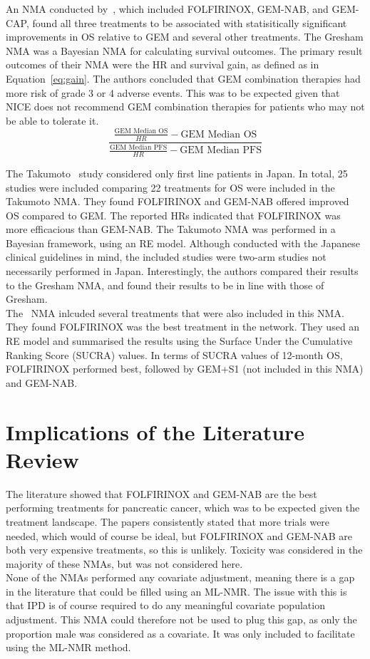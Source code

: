 An NMA conducted by~\cite{gresham2014}, which included FOLFIRINOX, GEM-NAB, and GEM-CAP, found all three treatments to be associated with statisitically significant improvements in OS relative to GEM and several other treatments. The Gresham NMA was a Bayesian NMA for calculating survival outcomes. The primary result outcomes of their NMA were the HR and survival gain, as defined as in Equation~\ref{eq:gain}. The authors concluded that GEM combination therapies had more risk of grade 3 or 4 adverse events. This was to be expected given that NICE does not recommend GEM combination therapies for patients who may not be able to tolerate it. \\

\begin{equation}
    \frac{\frac{\text{GEM Median OS}}{HR}-\text{GEM Median OS}}{\frac{\text{GEM Median PFS}}{HR}-\text{GEM Median PFS}}
    \label{eq:gain}
\end{equation}

The Takumoto~\cite{takumoto} study considered only first line patients in Japan. In total, 25 studies were included comparing 22 treatments for OS were included in the Takumoto NMA. They found FOLFIRINOX and GEM-NAB offered improved OS compared to GEM. The reported HRs indicated that FOLFIRINOX was more efficacious than GEM-NAB. The Takumoto NMA was performed in a Bayesian framework, using an RE model. Although conducted with the Japanese clinical guidelines in mind, the included studies were two-arm studies not necessarily performed in Japan. Interestingly, the authors compared their results to the Gresham NMA, and found their results to be in line with those of Gresham. \\

The~\cite{zhang} NMA inlcuded several treatments that were also included in this NMA. They found FOLFIRINOX was the best treatment in the network. They used an RE model and summarised the results using the Surface Under the Cumulative Ranking Score (SUCRA) values. In terms of SUCRA values of 12-month OS, FOLFIRINOX performed best, followed by GEM+S1 (not included in this NMA) and GEM-NAB. 

\section{Implications of the Literature Review}
The literature showed that FOLFIRINOX and GEM-NAB are the best performing treatments for pancreatic cancer, which was to be expected given the treatment landscape. The papers consistently stated that more trials were needed, which would of course be ideal, but FOLFIRINOX and GEM-NAB are both very expensive treatments, so this is unlikely. Toxicity was considered in the majority of these NMAs, but was not considered here. \\

None of the NMAs performed any covariate adjustment, meaning there is a gap in the literature that could be filled using an ML-NMR. The issue with this is that IPD is of course required to do any meaningful covariate population adjustment. This NMA could therefore not be used to plug this gap, as only the proportion male was considered as a covariate. It was only included to facilitate using the ML-NMR method.  \\